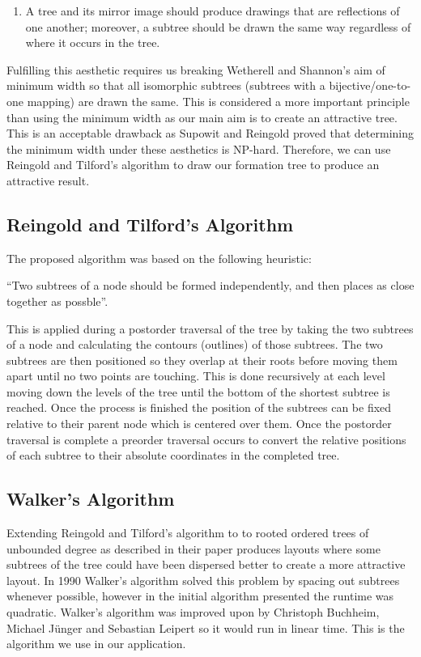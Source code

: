 \documentclass[draft]{report}
\begin{document}
\begin{enumerate}[leftmargin=*, align=left, label=\bfseries Aesthetic {4}:]
\item A tree and its mirror image should produce drawings that are reflections of one another; moreover, a subtree should be drawn the same way regardless of where it occurs in the tree.
\end{enumerate}

Fulfilling this aesthetic requires us breaking Wetherell and Shannon's aim of minimum width so that all isomorphic subtrees (subtrees with a bijective/one-to-one mapping) are drawn the same. This is considered a more important principle than using the minimum width as our main aim is to create an attractive tree. This is an acceptable drawback as Supowit and Reingold proved that determining the minimum width under these aesthetics is NP-hard\cite{complexityofdrawingtreesnicely}. Therefore, we can use Reingold and Tilford's algorithm to draw our formation tree to produce an attractive result. 

\subsection{Reingold and Tilford's Algorithm}

The proposed algorithm was based on the following heuristic: 

``Two subtrees of a node should be formed independently, and then places as close together as possble''\cite{tidierdrawingsws}.

This is applied during a postorder traversal of the tree by taking the two subtrees of a node and calculating the contours (outlines) of those subtrees. The two subtrees are then positioned so they overlap at their roots before moving them apart until no two points are touching. This is done recursively at each level moving down the levels of the tree until the bottom of the shortest subtree is reached. Once the process is finished the position of the subtrees can be fixed relative to their parent node which is centered over them. Once the postorder traversal is complete a preorder traversal occurs to convert the relative positions of each subtree to their absolute coordinates in the completed tree.

\subsection{Walker's Algorithm}

Extending Reingold and Tilford's algorithm to to rooted ordered trees of unbounded degree as described in their paper produces layouts where some subtrees of the tree could have been dispersed better to create a more attractive layout. In 1990 Walker's algorithm solved this problem by spacing out subtrees whenever possible, however in the initial algorithm presented the runtime was quadratic. Walker's algorithm was improved upon by Christoph Buchheim, Michael J\"unger and Sebastian Leipert so it would run in linear time\cite{improvingwalkers}. This is the algorithm we use in our application.
\end{document}
